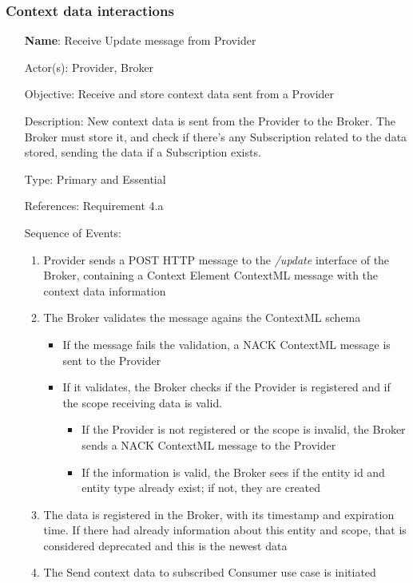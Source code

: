 \subsubsection{Context data interactions}
\begin{itemize}
	\item[\textbf{Name}:] Receive Update message from Provider
	\item[Actor(s):] Provider, Broker
	\item[Objective:] Receive and store context data sent from a Provider
	\item[Description:] New context data is sent from the Provider to the Broker. The Broker must store it, and check if there's any Subscription related to the data stored, sending the data if a Subscription exists.
	\item[Type:] Primary and Essential
	\item[References:] Requirement 4.a
	\item[Sequence of Events:]\hfill
	\begin{enumerate}
		\item Provider sends a POST HTTP message to the \textit{/update} interface of the Broker, containing a Context Element ContextML message with the context data information
		\item The Broker validates the message agains the ContextML schema
			\begin{itemize}
				\item If the message fails the validation, a NACK ContextML message is sent to the Provider
				\item If it validates, the Broker checks if the Provider is registered and if the scope receiving data is valid. 
				\begin{itemize}
					\item If the Provider is not registered or the scope is invalid, the Broker sends a NACK ContextML message to the Provider
					\item If the information is valid, the Broker sees if the entity id and entity type already exist; if not, they are created
				\end{itemize}
			\end{itemize}
			
			\item The data is registered in the Broker, with its timestamp and expiration time. If there had already information about this entity and scope, that is considered deprecated and this is the newest data
			\item The Send context data to subscribed Consumer use case is initiated
	\end{enumerate}
\end{itemize}

